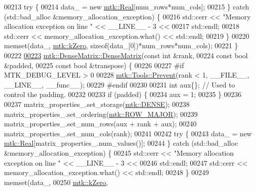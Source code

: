 \begin{DoxyCode}
00213   \textcolor{keywordflow}{try} \{
00214     data\_ = \textcolor{keyword}{new} \hyperlink{group__c01-roots_gac080bbbf5cbb5502c9f00405f894857d}{mtk::Real}[num\_rows*num\_cols];
00215   \} \textcolor{keywordflow}{catch} (std::bad\_alloc &memory\_allocation\_exception) \{
00216     std::cerr << \textcolor{stringliteral}{"Memory allocation exception on line "} << \_\_LINE\_\_ - 3 <<
00217       std::endl;
00218     std::cerr << memory\_allocation\_exception.what() << std::endl;
00219   \}
00220   memset(data\_, \hyperlink{group__c01-roots_ga59a451a5fae30d59649bcda274fea271}{mtk::kZero}, \textcolor{keyword}{sizeof}(data\_[0])*num\_rows*num\_cols);
00221 \}
00222 
\hypertarget{mtk__dense__matrix_8cc_source_l00223}{}\hyperlink{classmtk_1_1DenseMatrix_a4ef0dec1b5558fcf00719bfac059ec68}{00223} \hyperlink{classmtk_1_1DenseMatrix_a0c75ee704707983f935b02835eab0933}{mtk::DenseMatrix::DenseMatrix}(\textcolor{keyword}{const} \textcolor{keywordtype}{int} &rank,
00224                               \textcolor{keyword}{const} \textcolor{keywordtype}{bool} &padded,
00225                               \textcolor{keyword}{const} \textcolor{keywordtype}{bool} &transpose) \{
00226 
00227 \textcolor{preprocessor}{  #if MTK\_DEBUG\_LEVEL > 0}
00228   \hyperlink{classmtk_1_1Tools_a332324c6f25e66be9dff48c5987a3b9f}{mtk::Tools::Prevent}(rank < 1, \_\_FILE\_\_, \_\_LINE\_\_, \_\_func\_\_);
00229 \textcolor{preprocessor}{  #endif}
00230 
00231   \textcolor{keywordtype}{int} aux\{\};  \textcolor{comment}{// Used to control the padding.}
00232 
00233   \textcolor{keywordflow}{if} (padded) \{
00234     aux = 1;
00235   \}
00236 
00237   matrix\_properties\_.set\_storage(\hyperlink{namespacemtk_ga25b67ec6a2afeee69f9bb196a9c66619a00a806d43a7d74e9ccca47a2134e9c87}{mtk::DENSE});
00238   matrix\_properties\_.set\_ordering(\hyperlink{namespacemtk_ga622801bd9f912d0f976c3e383f5f581cabc55178ac16eb1ce89b5f3ab915a91f3}{mtk::ROW\_MAJOR});
00239   matrix\_properties\_.set\_num\_rows(aux + rank + aux);
00240   matrix\_properties\_.set\_num\_cols(rank);
00241 
00242   \textcolor{keywordflow}{try} \{
00243     data\_ = \textcolor{keyword}{new} \hyperlink{group__c01-roots_gac080bbbf5cbb5502c9f00405f894857d}{mtk::Real}[matrix\_properties\_.num\_values()];
00244   \} \textcolor{keywordflow}{catch} (std::bad\_alloc &memory\_allocation\_exception) \{
00245     std::cerr << \textcolor{stringliteral}{"Memory allocation exception on line "} << \_\_LINE\_\_ - 3 <<
00246       std::endl;
00247     std::cerr << memory\_allocation\_exception.what() << std::endl;
00248   \}
00249   memset(data\_,
00250          \hyperlink{group__c01-roots_ga59a451a5fae30d59649bcda274fea271}{mtk::kZero},

\end{DoxyCode}
